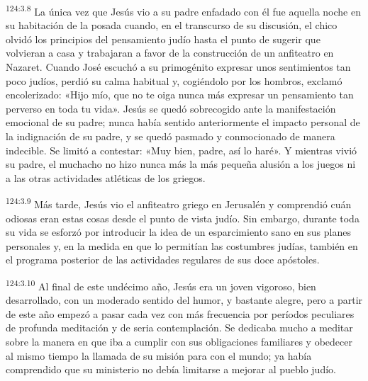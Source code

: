 \par 
\textsuperscript{124:3.8} La única vez que Jesús vio a su padre enfadado con él fue aquella noche en su habitación de la posada cuando, en el transcurso de su discusión, el chico olvidó los principios del pensamiento judío hasta el punto de sugerir que volvieran a casa y trabajaran a favor de la construcción de un anfiteatro en Nazaret. Cuando José escuchó a su primogénito expresar unos sentimientos tan poco judíos, perdió su calma habitual y, cogiéndolo por los hombros, exclamó encolerizado: «Hijo mío, que no te oiga nunca más expresar un pensamiento tan perverso en toda tu vida». Jesús se quedó sobrecogido ante la manifestación emocional de su padre; nunca había sentido anteriormente el impacto personal de la indignación de su padre, y se quedó pasmado y conmocionado de manera indecible. Se limitó a contestar: «Muy bien, padre, así lo haré». Y mientras vivió su padre, el muchacho no hizo nunca más la más pequeña alusión a los juegos ni a las otras actividades atléticas de los griegos.

\par 
\textsuperscript{124:3.9} Más tarde, Jesús vio el anfiteatro griego en Jerusalén y comprendió cuán odiosas eran estas cosas desde el punto de vista judío. Sin embargo, durante toda su vida se esforzó por introducir la idea de un esparcimiento sano en sus planes personales y, en la medida en que lo permitían las costumbres judías, también en el programa posterior de las actividades regulares de sus doce apóstoles.

\par 
\textsuperscript{124:3.10} Al final de este undécimo año, Jesús era un joven vigoroso, bien desarrollado, con un moderado sentido del humor, y bastante alegre, pero a partir de este año empezó a pasar cada vez con más frecuencia por períodos peculiares de profunda meditación y de seria contemplación. Se dedicaba mucho a meditar sobre la manera en que iba a cumplir con sus obligaciones familiares y obedecer al mismo tiempo la llamada de su misión para con el mundo; ya había comprendido que su ministerio no debía limitarse a mejorar al pueblo judío.

